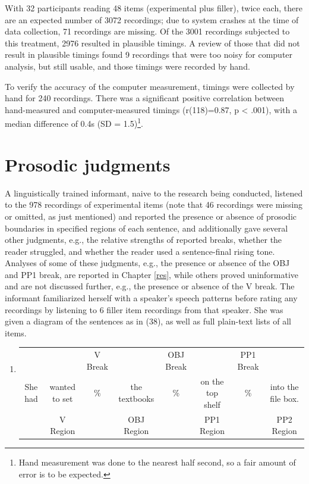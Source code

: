 \documentclass[11pt,oneside]{book}
\providecommand{\tightlist}{%
  \setlength{\itemsep}{0pt}\setlength{\parskip}{0pt}}
\let\rmarkdownfootnote\footnote%
\def\footnote{\protect\rmarkdownfootnote}
\begin{document}
With 32 participants reading 48 items (experimental plus filler), twice each, there are an expected number of 3072 recordings; due to system crashes at the time of data collection, 71 recordings are missing. Of the 3001 recordings subjected to this treatment, 2976 resulted in plausible timings. A review of those that did not result in plausible timings found 9 recordings that were too noisy for computer analysis, but still usable, and those timings were recorded by hand.

To verify the accuracy of the computer measurement, timings were collected by hand for 240 recordings. There was a significant positive correlation between hand-measured and computer-measured timings (r(118)=0.87, p \textless{} .001), with a median difference of 0.4s (SD = 1.5)\footnote{Hand measurement was done to the nearest half second, so a fair amount of error is to be expected.}.

\hypertarget{sita}{%
\section{Prosodic judgments}\label{sita}}

A linguistically trained informant, naive to the research being conducted, listened to the 978 recordings of experimental items (note that 46 recordings were missing or omitted, as just mentioned) and reported the presence or absence of prosodic boundaries in specified regions of each sentence, and additionally gave several other judgments, e.g., the relative strengths of reported breaks, whether the reader struggled, and whether the reader used a sentence-final rising tone. Analyses of some of these judgments, e.g., the presence or absence of the OBJ and PP1 break, are reported in Chapter \ref{res}, while others proved uninformative and are not discussed further, e.g., the presence or absence of the V break. The informant familiarized herself with a speaker's speech patterns before rating any recordings by listening to 6 filler item recordings from that speaker. She was given a diagram of the sentences as in (38), as well as full plain-text lists of all items.

\begin{enumerate}
\def\labelenumi{(\arabic{enumi})}
\setcounter{enumi}{37}
\tightlist
\item
  \begingroup
  \setlength{\tabcolsep}{1pt}

  \begin{tabular}{cccccccc}
    & & \footnotesize V Break & & \footnotesize OBJ Break & & \footnotesize PP1 Break & \\
    She had & wanted to set & \% & the textbooks & \% & on the top shelf & \% & into the file box. \\
    \cmidrule(r){2-2} \cmidrule(r){4-4} \cmidrule(r){6-6} \cmidrule(r){8-8} 
    & \footnotesize V Region & & \footnotesize OBJ Region & & \footnotesize PP1 Region & & PP2 Region \\
  \end{tabular}
    \endgroup
\end{enumerate}
\end{document}
